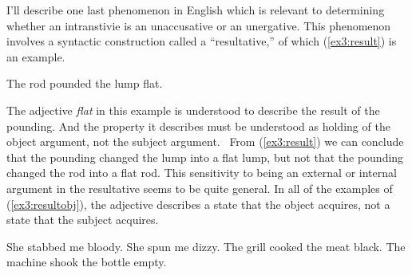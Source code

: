 I'll describe one last phenomenon in English which is relevant to determining whether an intranstivie is an unaccusative or an unergative. This phenomenon involves a syntactic construction called a ``resultative,'' of which (\ref{ex3:result}) is an example.
\begin{exe}
\raggedright
	\ex \label{ex3:result} The rod pounded the lump flat.
\end{exe}
The adjective \textit{flat} in this example is understood to describe the result of the pounding. And the property it describes must be understood as holding of the object argument, not the subject argument.%
%
%
%
\ From (\ref{ex3:result}) we can conclude that the pounding changed the lump into a flat lump, but not that the pounding changed the rod into a flat rod. This sensitivity to being an external or internal argument in the resultative seems to be quite general. In all of the examples of (\ref{ex3:resultobj}), the adjective describes a state that the object acquires, not a state that the subject acquires.
\begin{exe}
\raggedright
	\ex \label{ex3:resultobj}
	\begin{xlist}
		\ex She stabbed me bloody.
		\ex She spun me dizzy.
		\ex The grill cooked the meat black.
		\ex The machine shook the bottle empty.
	\end{xlist}
\end{exe}

